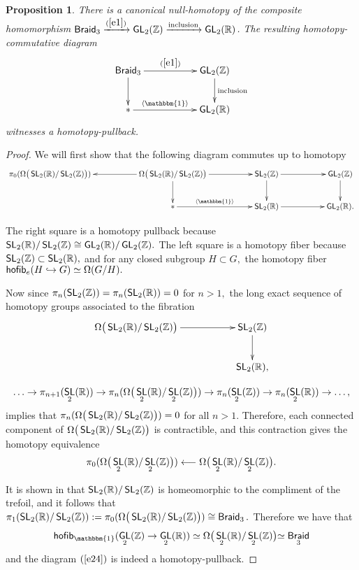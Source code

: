 \documentclass{amsart}
\newtheorem{prop}[theorem]{Proposition}
\theoremstyle{definition}
\theoremstyle{remark}
\newcommand{\lag}{\langle}
\newcommand{\rag}{\rangle}
\newcommand{\xra}{\xrightarrow}
\DeclareMathOperator{\uno}{\mathbbm{1}}
\DeclareMathOperator{\Braid}{\sf Braid}
\DeclareMathOperator{\GL}{\sf GL}
\DeclareMathOperator{\SL}{\sf SL}
\begin{document}
\begin{prop}\label{t8}
There is a canonical null-homotopy of the composite homomorphism $\Braid_3 \xra{(\ref{e1})} \GL_2(\ZZ) \xra{\rm inclusion} \GL_2(\RR)$.  
The resulting homotopy-commutative diagram 
\begin{equation}\label{e24}
\xymatrix{
\Braid_3 \ar[rr]^-{(\ref{e1})} \ar[d]
&&
\GL_2(\ZZ) \ar[d]^-{\rm inclusion}
\\
\ast \ar[rr]^-{\lag \uno \rag}
&&
\GL_2(\RR)
}
\end{equation}
witnesses a homotopy-pullback.  
\end{prop}
\begin{proof}


We will first show that the following diagram commutes up to homotopy 
$$
\xymatrix{
\pi_{0}(\Omega \bigr( \SL_{2}(\RR)/\SL_{2}(\ZZ) \bigl)) && \ar[ll] 
\Omega \bigr( \SL_{2}(\RR)/\SL_{2}(\ZZ) \bigl) \ar[rr] \ar[d] && 
\SL_{2}(\ZZ) \ar[rr] \ar[d]&& 
\GL_{2}(\ZZ) \ar[d]
\\  && \ast \ar[rr]^-{\langle \uno \rangle} && \SL_{2}(\RR) \ar[rr] && \GL_{2}(\RR).
}$$

The right square is a homotopy pullback because $\SL_{2}(\RR)/\SL_{2}(\ZZ) \cong \GL_{2}(\RR)/\GL_{2}(\ZZ).$ The left square is a homotopy fiber because $\SL_{2}(\ZZ) \subset \SL_{2}(\RR),$ and for any closed subgroup $H \subset G,$ the homotopy fiber ${\sf hofib}_{e}(H \hookrightarrow G) \simeq \Omega(G/H).$


Now since $\pi_{n}(\SL_{2}(\ZZ)) = \pi_{n}(\SL_{2}(\RR)) = 0$ for $n > 1,$ the long exact sequence of homotopy groups associated to the fibration
$$
\xymatrix{
\Omega \bigr( \SL_{2}(\RR)/\SL_{2}(\ZZ) \bigl) \ar[rr]  && \SL_{2}(\ZZ)  \ar[d] \\
  && \SL_{2}(\RR), 
}
$$

$$ \hdots \rightarrow \pi_{n+1}(\SL_{2}(\RR)) \rightarrow \pi_{n}(\Omega \bigr( \SL_{2}(\RR)/\SL_{2}(\ZZ) \bigl)) \rightarrow \pi_{n}(\SL_{2}(\ZZ)) \rightarrow \pi_{n}(\SL_{2}(\RR)) \rightarrow \hdots,$$ implies that $\pi_{n}(\Omega \bigr( \SL_{2}(\RR)/\SL_{2}(\ZZ) \bigl)) = 0$ for all $n > 1.$ Therefore, each connected component of $\Omega \bigr( \SL_{2}(\RR)/\SL_{2}(\ZZ) \bigl)$ is contractible, and this contraction gives the homotopy equivalence $$\pi_{0}(\Omega \bigr( \SL_{2}(\RR)/\SL_{2}(\ZZ) \bigl)) \longleftarrow \Omega \bigr(\SL_{2}(\RR)/\SL_{2}(\ZZ) \bigl).$$

It is shown in \cite{mil} that $\SL_2(\RR) / \SL_2(\ZZ)$ is homeomorphic to the compliment of the trefoil, and it follows that $\pi_1( \SL_2(\RR) / \SL_2(\ZZ)) := \pi_{0}(\Omega \bigr( \SL_{2}(\RR)/\SL_{2}(\ZZ) \bigl)) \cong \Braid_{3}.$ Therefore we have that $${\sf hofib}_{\uno}(\GL_{2}(\ZZ) \rightarrow \GL_{2}(\RR)) \simeq \Omega \bigr( \SL_{2}(\RR)/\SL_{2}(\ZZ) \bigl) \simeq \Braid_{3}$$ and the diagram $(\ref{e24})$ is indeed a homotopy-pullback.
\end{proof}
\end{document}

